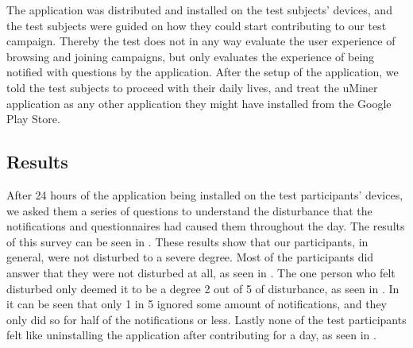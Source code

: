 The application was distributed and installed on the test subjects' devices, and the test subjects were guided on how they could start contributing to our test campaign. Thereby the test does not in any way evaluate the user experience of browsing and joining campaigns, but only evaluates the experience of being notified with questions by the application. After the setup of the application, we told the test subjects to proceed with their daily lives, and treat the uMiner application as any other application they might have installed from the Google Play Store. 

\subsection{Results}
\label{sub:results}
After 24 hours of the application being installed on the test participants' devices, we asked them a series of questions to understand the disturbance that the notifications and questionnaires had caused them throughout the day. The results of this survey can be seen in . These results show that our participants, in general, were not disturbed to a severe degree. Most of the participants did answer that they were not disturbed at all, as seen in . The one person who felt disturbed only deemed it to be a degree 2 out of 5 of disturbance, as seen in . In  it can be seen that only 1 in 5 ignored some amount of notifications, and they only did so for half of the notifications or less. Lastly none of the test participants felt like uninstalling the application after contributing for a day, as seen in .

